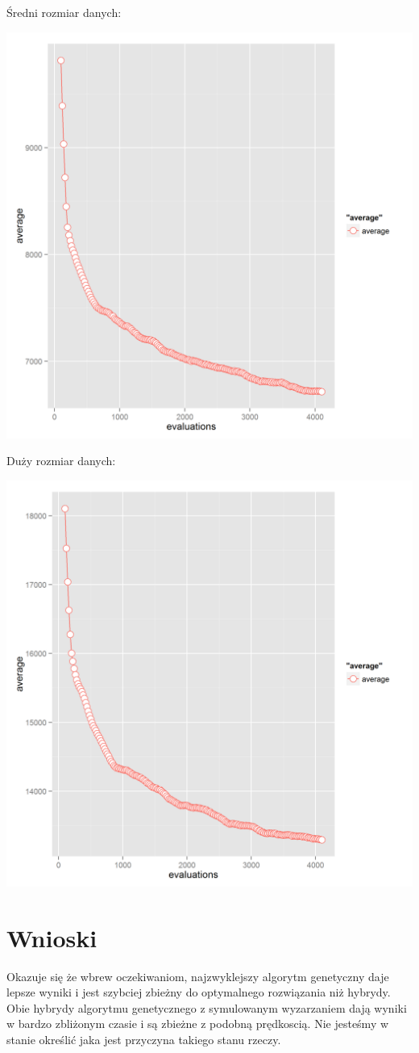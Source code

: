 Średni rozmiar danych:

\includegraphics[]{tournament_cooling_graph1.png}

Duży rozmiar danych:

\includegraphics[]{tournament_cooling_graph2.png}

\section*{Wnioski}

Okazuje się że wbrew oczekiwaniom, najzwyklejszy algorytm genetyczny daje lepsze wyniki i jest szybciej zbieżny do optymalnego rozwiązania niż hybrydy. Obie hybrydy algorytmu genetycznego z symulowanym wyzarzaniem dają wyniki w bardzo zbliżonym czasie i są zbieżne z podobną prędkoscią. Nie jesteśmy w stanie określić jaka jest przyczyna takiego stanu rzeczy.
